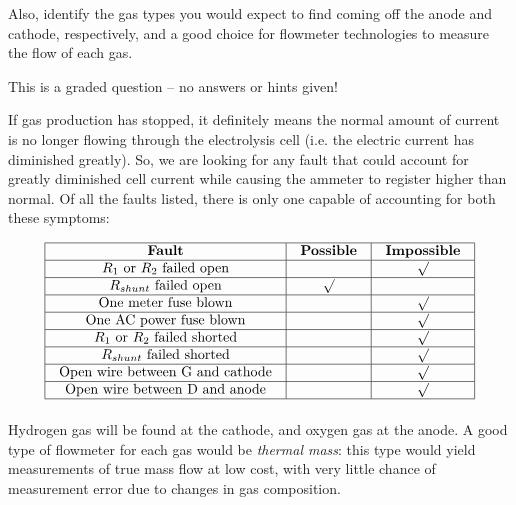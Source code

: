 Also, identify the gas types you would expect to find coming off the anode and cathode, respectively, and a good choice for flowmeter technologies to measure the flow of each gas.


\vfil

\eject






This is a graded question -- no answers or hints given!







If gas production has stopped, it definitely means the normal amount of current is no longer flowing through the electrolysis cell (i.e. the electric current has diminished greatly).  So, we are looking for any fault that could account for greatly diminished cell current while causing the ammeter to register higher than normal.  Of all the faults listed, there is only one capable of accounting for both these symptoms:


$$\vbox{\offinterlineskip
\halign{\strut
\vrule \quad\hfil # \ \hfil & 
\vrule \quad\hfil # \ \hfil & 
\vrule \quad\hfil # \ \hfil \vrule \cr
\noalign{\hrule}
%
{\bf Fault} & {\bf Possible} & {\bf Impossible} \cr
%
\noalign{\hrule}
%
$R_1$ or $R_2$ failed open &  & $\surd$ \cr
%
\noalign{\hrule}
%
$R_{shunt}$ failed open & $\surd$ &  \cr
%
\noalign{\hrule}
%
One meter fuse blown &  & $\surd$ \cr
%
\noalign{\hrule}
%
One AC power fuse blown &  & $\surd$ \cr
%
\noalign{\hrule}
%
$R_1$ or $R_2$ failed shorted &  & $\surd$ \cr
%
\noalign{\hrule}
%
$R_{shunt}$ failed shorted &  & $\surd$ \cr
%
\noalign{\hrule}
%
Open wire between G and cathode &  & $\surd$ \cr
%
\noalign{\hrule}
%
Open wire between D and anode &  & $\surd$ \cr
%
\noalign{\hrule}
} %
}$$ %

Hydrogen gas will be found at the cathode, and oxygen gas at the anode.  A good type of flowmeter for each gas would be {\it thermal mass}: this type would yield measurements of true mass flow at low cost, with very little chance of measurement error due to changes in gas composition.

